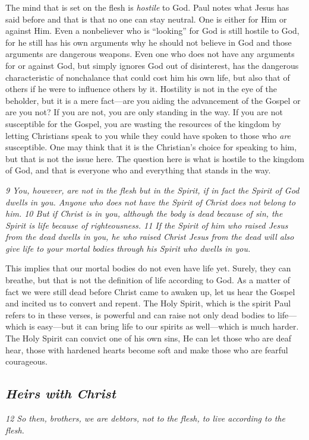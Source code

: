 The mind that is set on the flesh is \emph{hostile} to God. Paul notes
what Jesus has said before and that is that no one can stay neutral. One
is either for Him or against Him. Even a nonbeliever who is ``looking''
for God is still hostile to God, for he still has his own arguments why
he should not believe in God and those arguments are dangerous weapons.
Even one who does not have any arguments for or against God, but simply
ignores God out of disinterest, has the dangerous characteristic of
nonchalance that could cost him his own life, but also that of others if
he were to influence others by it. Hostility is not in the eye of the
beholder, but it is a mere fact---are you aiding the advancement of the
Gospel or are you not? If you are not, you are only standing in the way.
If you are not susceptible for the Gospel, you are wasting the resources
of the kingdom by letting Christians speak to you while they could have
spoken to those who \emph{are} susceptible. One may think that it is the
Christian's choice for speaking to him, but that is not the issue here.
The question here is what is hostile to the kingdom of God, and that is
everyone who and everything that stands in the way.

\emph{9 You, however, are not in the flesh but in the Spirit, if in fact
the Spirit of God dwells in you. Anyone who does not have the Spirit of
Christ does not belong to him. 10 But if Christ is in you, although the
body is dead because of sin, the Spirit is life because of
righteousness. 11 If the Spirit of him who raised Jesus from the dead
dwells in you, he who raised Christ Jesus from the dead will also give
life to your mortal bodies through his Spirit who dwells in you.}

This implies that our mortal bodies do not even have life yet. Surely,
they can breathe, but that is not the definition of life according to
God. As a matter of fact we were still dead before Christ came to awaken
up, let us hear the Gospel and incited us to convert and repent. The
Holy Spirit, which is the spirit Paul refers to in these verses, is
powerful and can raise not only dead bodies to life---which is
easy---but it can bring life to our spirits as well---which is much
harder. The Holy Spirit can convict one of his own sins, He can let
those who are deaf hear, those with hardened hearts become soft and make
those who are fearful courageous.

\subsection{\emph{Heirs with Christ}} \emph{12 So then, brothers, we are
debtors, not to the flesh, to live according to the flesh.}


